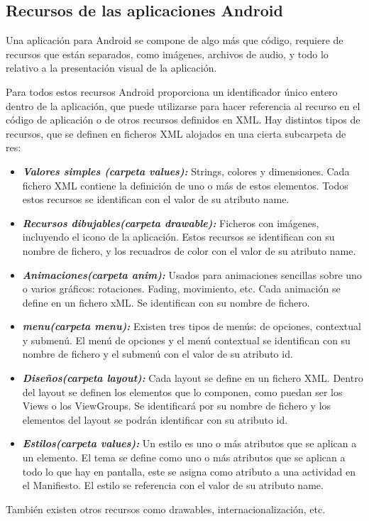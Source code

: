 \subsection{Recursos de las aplicaciones Android }
 
Una aplicación para Android se compone de algo más que código, requiere de recursos que están separados, como imágenes, archivos de audio, y todo lo relativo a la presentación visual de la aplicación.

Para todos estos recursos Android proporciona un identificador único entero dentro de la aplicación, que puede utilizarse para hacer referencia al recurso en el código de aplicación o de otros recursos definidos en XML. 
Hay distintos tipos de recursos, que se definen en ficheros XML alojados en una cierta subcarpeta de res: 

\begin{itemize}	

	\item \emph{\textbf{Valores simples \textit{(carpeta values)}: }}  Strings, colores y dimensiones. Cada fichero XML contiene la definición de uno o más de estos elementos. Todos estos recursos se identifican con el valor de su atributo name. 
	
	\item \emph{\textbf{Recursos dibujables\textit{(carpeta drawable)}: }} Ficheros con imágenes, incluyendo el icono de la aplicación. Estos recursos se identifican con su nombre de fichero, y los recuadros de color con el valor de su atributo name.
	 
	\item \emph{\textbf{Animaciones\textit{(carpeta anim)}: }} Usados para animaciones sencillas sobre uno o varios gráficos: rotaciones. Fading, movimiento, etc. Cada animación se define en un fichero xML. Se identifican con su nombre de fichero. 
	
	\item \emph{\textbf{menu\textit{(carpeta menu)}: }}  Existen tres tipos de menús: de opciones, contextual y submenú. El menú de opciones y el menú contextual se identifican con su nombre de fichero y el submenú con el valor de su atributo id. 
	
	\item \emph{\textbf{Diseños\textit{(carpeta layout)}: }}  Cada layout se define en un fichero XML. Dentro del layout se definen los elementos que lo componen, como puedan ser los Views o los ViewGroups. Se identificará por su nombre de fichero y los elementos del layout se podrán identificar con su atributo id. 
	
	\item \emph{\textbf{Estilos\textit{(carpeta values)}: }} Un estilo es uno o más atributos que se aplican a un elemento. El tema se define como uno o más atributos que se aplican a todo lo que hay en pantalla, este se asigna como atributo a una actividad en el Manifiesto. El estilo se referencia con el valor de su atributo name.  
					
\end{itemize}

También existen otros recursos como drawables, internacionalización, etc.





